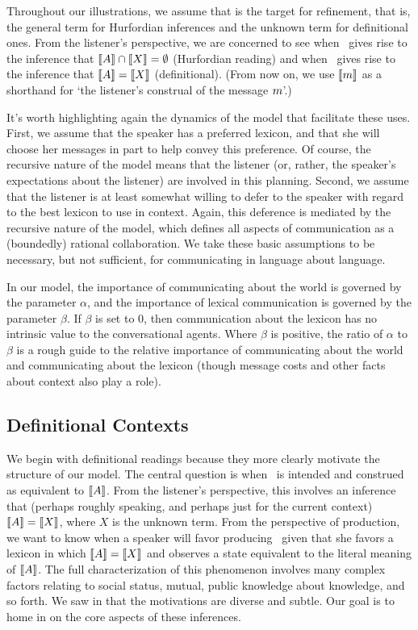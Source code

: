 \documentclass[12pt,twoside]{article}
\renewcommand{\_}{\textbf{\textunderscore\hspace{-4pt}\textunderscore\hspace{-3pt}\textunderscore\hspace{-4pt}\textunderscore}\hspace{0.5pt}}			%
\begin{document}
Throughout our illustrations, we assume that  is the target
for refinement, that is, the general term for Hurfordian inferences
and the unknown term for definitional ones.  From the listener's
perspective, we are concerned to see when \AorX\ gives rise to
the inference that $\llbracket A\rrbracket \cap \llbracket X\rrbracket = \emptyset$ (Hurfordian
reading) and when \AorX\ gives rise to the inference that
$\llbracket A\rrbracket = \llbracket X\rrbracket$ (definitional). (From now on, we use $\llbracket m\rrbracket$
as a shorthand for `the listener's construal of the message $m$'.)

It's worth highlighting again the dynamics of the model that
facilitate these uses. First, we assume that the speaker has a
preferred lexicon, and that she will choose her messages in part to
help convey this preference. Of course, the recursive nature of the
model means that the listener (or, rather, the speaker's expectations
about the listener) are involved in this planning. Second, we assume
that the listener is at least somewhat willing to defer to the speaker
with regard to the best lexicon to use in context. Again, this
deference is mediated by the recursive nature of the model, which
defines all aspects of communication as a (boundedly) rational
collaboration. We take these basic assumptions to be necessary, but
not sufficient, for communicating in language about language.

In our model, the importance of communicating about the world is
governed by the parameter $\alpha$, and the importance of lexical
communication is governed by the parameter $\beta$. If $\beta$ is set
to $0$, then communication about the lexicon has no intrinsic value to
the conversational agents.  Where $\beta$ is positive, the ratio of
$\alpha$ to $\beta$ is a rough guide to the relative importance of
communicating about the world and communicating about the lexicon
(though message costs and other facts about context also play a role).


\subsection{Definitional Contexts}\label{sec:analysis:definitional}

We begin with definitional readings because they more clearly motivate
the structure of our model. The central question is when
\AorX\ is intended and construed as equivalent to
$\llbracket A\rrbracket$. From the listener's perspective, this involves an inference
that (perhaps roughly speaking, and perhaps just for the current
context) $\llbracket A\rrbracket=\llbracket X\rrbracket$, where $X$ is the unknown term. From the
perspective of production, we want to know when a speaker will favor
producing \AorX\ given that she favors a lexicon in which
$\llbracket A\rrbracket=\llbracket X\rrbracket$ and observes a state equivalent to the literal
meaning of $\llbracket A\rrbracket$. The full characterization of this phenomenon
involves many complex factors relating to social status, mutual,
public knowledge about knowledge, and so forth. We saw in
 that the motivations are diverse and subtle. Our
goal is to home in on the core aspects of these inferences.
\end{document}
